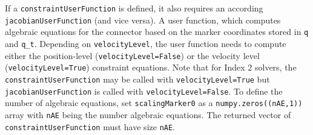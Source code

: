     If a \texttt{constraintUserFunction} is defined, it also requires an according \texttt{jacobianUserFunction} (and vice versa).
    A user function, which computes algebraic equations for the connector based on the marker coordinates stored in \texttt{q} and \texttt{q\_t}.
    Depending on \texttt{velocityLevel}, the user function needs to compute either the position-level (\texttt{velocityLevel=False}) or
    the velocity level (\texttt{velocityLevel=True}) constraint equations.
    Note that for Index 2 solvers, the \texttt{constraintUserFunction} may be called with \texttt{velocityLevel=True} but \texttt{jacobianUserFunction} 
    is called with \texttt{velocityLevel=False}.
    To define the number of algebraic equations, set \texttt{scalingMarker0} as a \texttt{numpy.zeros((nAE,1))} array with \texttt{nAE} being the number algebraic equations. 
    The returned vector of \texttt{constraintUserFunction} must have size \texttt{nAE}.

